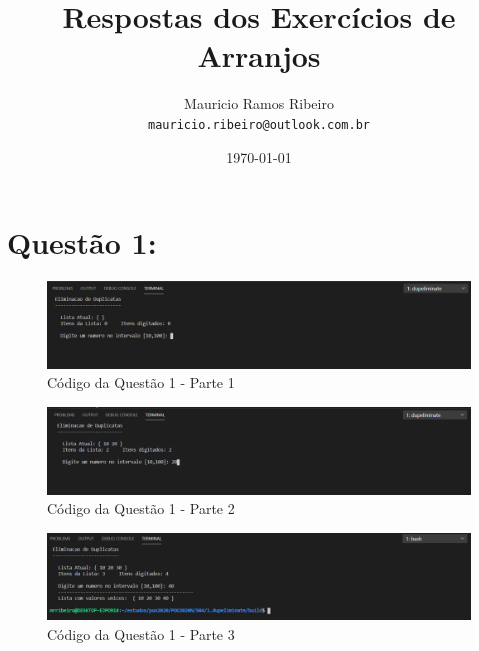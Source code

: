 \documentclass{article}
\author{
  Mauricio Ramos Ribeiro\\
  \texttt{mauricio.ribeiro@outlook.com.br}
}
\title{Respostas dos Exercícios de Arranjos}
\date{\today}
\begin{document}
\maketitle

\vspace{15mm}


\section*{Questão 1:}

\begin{figure}[h!]
  \includegraphics[scale=0.6]{01.1.png}
  \caption{Código da Questão 1 - Parte 1}
\end{figure}
\begin{figure}[h!]
\includegraphics[scale=0.6]{01.2.png}
\caption{Código da Questão 1 - Parte 2}
\end{figure}
\begin{figure}[h!]
\includegraphics[scale=0.6]{01.3.png}
\caption{Código da Questão 1 - Parte 3}
\end{figure}
\vspace{15mm}
\end{document}
